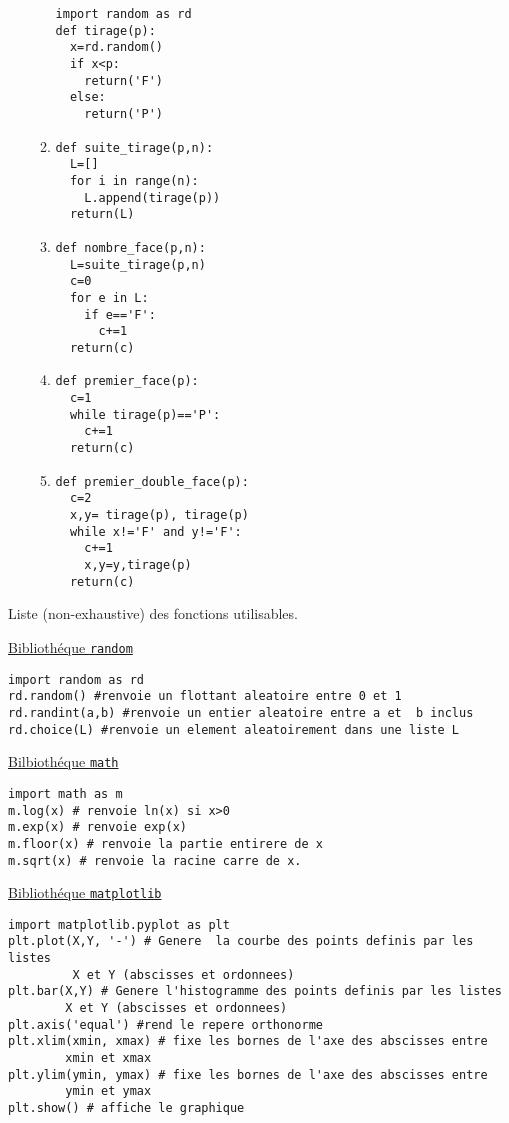 \documentclass[a4paper, 11pt,reqno]{article}
\begin{document}
\begin{correction}
\begin{enumerate}
\begin{enumerate}
\begin{lstlisting}
import random as rd
def tirage(p):
  x=rd.random()
  if x<p:
    return('F')
  else:
    return('P')
\end{lstlisting}

\item 
\begin{lstlisting}
def suite_tirage(p,n):
  L=[]
  for i in range(n):
    L.append(tirage(p))
  return(L)
\end{lstlisting}

\item 
\begin{lstlisting}
def nombre_face(p,n):
  L=suite_tirage(p,n)
  c=0
  for e in L:
    if e=='F':
      c+=1
  return(c)
\end{lstlisting}

\item 
\begin{lstlisting}
def premier_face(p):
  c=1
  while tirage(p)=='P':
    c+=1
  return(c)
\end{lstlisting}

\item 
\begin{lstlisting}
def premier_double_face(p):
  c=2
  x,y= tirage(p), tirage(p)
  while x!='F' and y!='F':
    c+=1
    x,y=y,tirage(p)
  return(c)
\end{lstlisting}
\end{enumerate}
\end{enumerate}
\end{correction}



Liste (non-exhaustive) des fonctions utilisables. 

\underline{Bibliothéque \texttt{random}}
\begin{lstlisting}
import random as rd
rd.random() #renvoie un flottant aleatoire entre 0 et 1
rd.randint(a,b) #renvoie un entier aleatoire entre a et  b inclus
rd.choice(L) #renvoie un element aleatoirement dans une liste L
\end{lstlisting}

\underline{Bilbiothéque \texttt{math}}
\begin{lstlisting}
import math as m
m.log(x) # renvoie ln(x) si x>0
m.exp(x) # renvoie exp(x)
m.floor(x) # renvoie la partie entirere de x
m.sqrt(x) # renvoie la racine carre de x. 
\end{lstlisting}

\underline{Bibliothéque \texttt{matplotlib}}
\begin{lstlisting}
import matplotlib.pyplot as plt
plt.plot(X,Y, '-') # Genere  la courbe des points definis par les listes
		 X et Y (abscisses et ordonnees) 
plt.bar(X,Y) # Genere l'histogramme des points definis par les listes 
		X et Y (abscisses et ordonnees) 
plt.axis('equal') #rend le repere orthonorme
plt.xlim(xmin, xmax) # fixe les bornes de l'axe des abscisses entre 
		xmin et xmax
plt.ylim(ymin, ymax) # fixe les bornes de l'axe des abscisses entre 
		ymin et ymax
plt.show() # affiche le graphique
\end{lstlisting}
\end{document}
